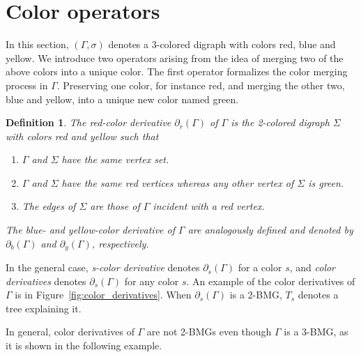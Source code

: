 \documentclass[final,3p,times]{elsarticle}
\newtheorem{definition}{Definition}[section]
\newcommand{\mh}[1]{\begingroup\color{magenta}#1\endgroup}
\begin{document}
\section{Color operators}
\label{sec:operators}
\mh{}

In this section, $(\Gamma,\sigma)$ denotes a 3-colored digraph with colors red, blue and yellow. 
We introduce two operators arising from the idea of merging two of the above colors into a unique color. The first operator formalizes the color merging process in $\Gamma$. Preserving one color, for instance red, and merging the other two, blue and yellow, into a unique new color named green.

\begin{definition}
\label{def:color-derivative}
The \emph{red-color derivative} $\partial_r(\Gamma)$ of $\Gamma$ is the 2-colored digraph $\Sigma$ with colors red and yellow such that
\begin{enumerate}
    \item $\Gamma$ and $\Sigma$ have the same vertex set. 
    \item $\Gamma$ and $\Sigma$ have the same red vertices whereas any other vertex of $\Sigma$ is green. 
    \item The edges of $\Sigma$ are those of $\Gamma$ incident with a red vertex. 
\end{enumerate}
The blue- and yellow-color derivative of $\Gamma$ are analogously defined and denoted by $\partial_b(\Gamma)$ and $\partial_y(\Gamma)$, respectively. 
\end{definition} 

In the general case, \emph{s-color derivative} denotes $\partial_s(\Gamma)$ for a color $s$, and \emph{color derivatives} denotes $\partial_s(\Gamma)$ for any color $s$. An example of the color derivatives of $\Gamma$ is in Figure~\ref{fig:color_derivatives}. When $\partial_s(\Gamma)$ is a 2-BMG, $T_s$ denotes a tree explaining it.

In general, color derivatives of $\Gamma$ are not 2-BMGs even though $\Gamma$ is a 3-BMG, as it is shown in the following example.
\end{document}
